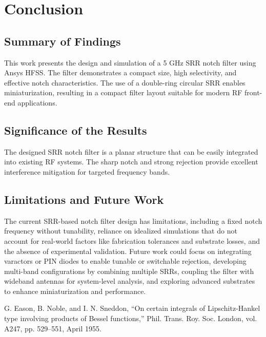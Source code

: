 \documentclass[conference]{IEEEtran}
\begin{document}
\section{Conclusion}
\subsection{Summary of Findings}
This work presents the design and simulation of a 5 GHz SRR notch filter using Ansys HFSS. The filter demonstrates a compact size, high selectivity, and effective notch characteristics. The use of a double-ring circular SRR enables miniaturization, resulting in a compact filter layout suitable for modern RF front-end applications.

\subsection{Significance of the Results}
The designed SRR notch filter is a planar structure that can be easily integrated into existing RF systems. The sharp notch and strong rejection provide excellent interference mitigation for targeted frequency bands. 

\subsection{Limitations and Future Work}
The current SRR-based notch filter design has limitations, including a fixed notch frequency without tunability, reliance on idealized simulations that do not account for real-world factors like fabrication tolerances and substrate losses, and the absence of experimental validation. Future work could focus on integrating varactors or PIN diodes to enable tunable or switchable rejection, developing multi-band configurations by combining multiple SRRs, coupling the filter with wideband antennas for system-level analysis, and exploring advanced substrates to enhance miniaturization and performance.


\begin{thebibliography}{00}
 G. Eason, B. Noble, and I. N. Sneddon, ``On certain integrals of Lipschitz-Hankel type involving products of Bessel functions,'' Phil. Trans. Roy. Soc. London, vol. A247, pp. 529--551, April 1955.

\end{thebibliography}
\end{document}
